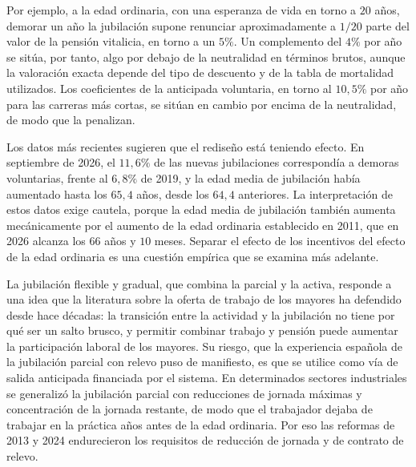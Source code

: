 \documentclass[10pt,a4paper]{article}
\begin{document}
Por ejemplo, a la edad ordinaria, con una esperanza de vida en torno a $20$ años, demorar un año la jubilación supone renunciar aproximadamente a $1/20$ parte del valor de la pensión vitalicia, en torno a un $5\%$. Un complemento del $4\%$ por año se sitúa, por tanto, algo por debajo de la neutralidad en términos brutos, aunque la valoración exacta depende del tipo de descuento y de la tabla de mortalidad utilizados. Los coeficientes de la anticipada voluntaria, en torno al $10,5\%$ por año para las carreras más cortas, se sitúan en cambio por encima de la neutralidad, de modo que la penalizan.

Los datos más recientes sugieren que el rediseño está teniendo efecto. En septiembre de 2026, el $11,6\%$ de las nuevas jubilaciones correspondía a demoras voluntarias, frente al $6,8\%$ de 2019, y la edad media de jubilación había aumentado hasta los $65,4$ años, desde los $64,4$ anteriores. La interpretación de estos datos exige cautela, porque la edad media de jubilación también aumenta mecánicamente por el aumento de la edad ordinaria establecido en 2011, que en 2026 alcanza los $66$ años y $10$ meses. Separar el efecto de los incentivos del efecto de la edad ordinaria es una cuestión empírica que se examina más adelante.

La jubilación flexible y gradual, que combina la parcial y la activa, responde a una idea que la literatura sobre la oferta de trabajo de los mayores ha defendido desde hace décadas: la transición entre la actividad y la jubilación no tiene por qué ser un salto brusco, y permitir combinar trabajo y pensión puede aumentar la participación laboral de los mayores. Su riesgo, que la experiencia española de la jubilación parcial con relevo puso de manifiesto, es que se utilice como vía de salida anticipada financiada por el sistema. En determinados sectores industriales se generalizó la jubilación parcial con reducciones de jornada máximas y concentración de la jornada restante, de modo que el trabajador dejaba de trabajar en la práctica años antes de la edad ordinaria. Por eso las reformas de 2013 y 2024 endurecieron los requisitos de reducción de jornada y de contrato de relevo.
\end{document}
